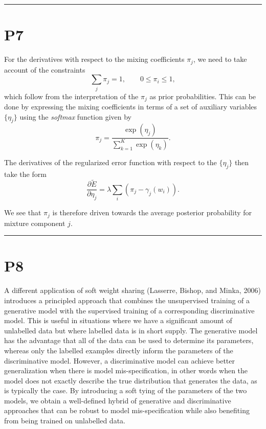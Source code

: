 \documentclass{article}
\begin{document}
\noindent\rule{\linewidth}{0.4pt}

\section{P7}

For the derivatives with respect to the mixing coefficients $\pi_j$, we need to take account of the constraints
\begin{equation}
\sum_j \pi_j = 1, \qquad 0 \leqslant \pi_i \leqslant 1,
\tag{9.29}
\end{equation}
which follow from the interpretation of the $\pi_j$ as prior probabilities. This can be done by expressing the mixing coefficients in terms of a set of auxiliary variables $\{\eta_j\}$ using the \emph{softmax} function given by
\begin{equation}
\pi_j = \frac{\exp(\eta_j)}{\sum_{k=1}^K \exp(\eta_k)}.
\tag{9.30}
\end{equation}

The derivatives of the regularized error function with respect to the $\{\eta_j\}$ then take the form
\begin{equation}
\frac{\partial \widetilde{E}}{\partial \eta_j} = \lambda \sum_i \left( \pi_j - \gamma_j(w_i) \right).
\tag{9.31}
\end{equation}

We see that $\pi_j$ is therefore driven towards the average posterior probability for mixture component $j$.

\noindent\rule{\linewidth}{0.4pt}

\section{P8}

A different application of soft weight sharing (Lasserre, Bishop, and Minka, 2006) introduces a principled approach that combines the unsupervised training of a generative model with the supervised training of a corresponding discriminative model. This is useful in situations where we have a significant amount of unlabelled data but where labelled data is in short supply. The generative model has the advantage that all of the data can be used to determine its parameters, whereas only the labelled examples directly inform the parameters of the discriminative model. However, a discriminative model can achieve better generalization when there is model mis-specification, in other words when the model does not exactly describe the true distribution that generates the data, as is typically the case. By introducing a soft tying of the parameters of the two models, we obtain a well-defined hybrid of generative and discriminative approaches that can be robust to model mis-specification while also benefiting from being trained on unlabelled data.
\end{document}
